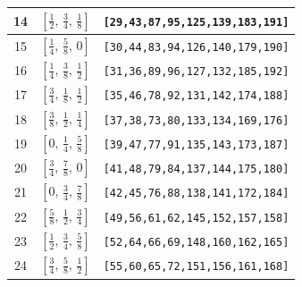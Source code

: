 \documentclass[fleqn,8pt]{jsarticle}
\begin{document}
\begin{longtable}{ccc}
14 & $\left[ \frac{1}{2},\, \frac{3}{4},\, \frac{1}{8} \right]$ & {\tt [29,43,87,95,125,139,183,191]} \\ \hline
15 & $\left[ \frac{1}{4},\, \frac{5}{8},\, 0 \right]$ & {\tt [30,44,83,94,126,140,179,190]} \\ \hline
16 & $\left[ \frac{1}{4},\, \frac{3}{8},\, \frac{1}{2} \right]$ & {\tt [31,36,89,96,127,132,185,192]} \\ \hline
17 & $\left[ \frac{3}{4},\, \frac{1}{8},\, \frac{1}{2} \right]$ & {\tt [35,46,78,92,131,142,174,188]} \\ \hline
18 & $\left[ \frac{3}{8},\, \frac{1}{2},\, \frac{1}{4} \right]$ & {\tt [37,38,73,80,133,134,169,176]} \\ \hline
19 & $\left[ 0,\, \frac{1}{4},\, \frac{5}{8} \right]$ & {\tt [39,47,77,91,135,143,173,187]} \\ \hline
20 & $\left[ \frac{3}{4},\, \frac{7}{8},\, 0 \right]$ & {\tt [41,48,79,84,137,144,175,180]} \\ \hline
21 & $\left[ 0,\, \frac{3}{4},\, \frac{7}{8} \right]$ & {\tt [42,45,76,88,138,141,172,184]} \\ \hline
22 & $\left[ \frac{5}{8},\, \frac{1}{2},\, \frac{3}{4} \right]$ & {\tt [49,56,61,62,145,152,157,158]} \\ \hline
23 & $\left[ \frac{1}{2},\, \frac{3}{4},\, \frac{5}{8} \right]$ & {\tt [52,64,66,69,148,160,162,165]} \\ \hline
24 & $\left[ \frac{3}{4},\, \frac{5}{8},\, \frac{1}{2} \right]$ & {\tt [55,60,65,72,151,156,161,168]} \\
\end{longtable}
\renewcommand{\arraystretch}{1.2}
\end{document}
